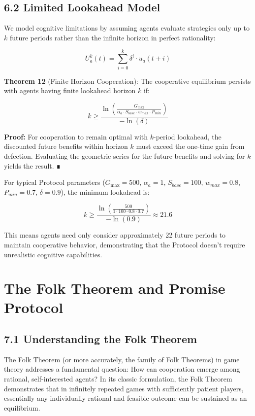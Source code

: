 \documentclass[11pt]{article}
\begin{document}
\subsection{6.2 Limited Lookahead Model}
\label{sec:org3d7af79}
We model cognitive limitations by assuming agents evaluate strategies only up to \(k\) future periods rather than the infinite horizon in perfect rationality:

\[
U_a^k(t) = \sum_{i=0}^{k} \delta^i \cdot u_a(t+i)
\]

\textbf{Theorem 12} (Finite Horizon Cooperation):
The cooperative equilibrium persists with agents having finite lookahead horizon \(k\) if:

\[
k \geq \frac{\ln\left(\frac{G_{\max}}{\alpha_a \cdot S_{base} \cdot w_{max} \cdot P_{min}}\right)}{-\ln(\delta)}
\]

\textbf{Proof:}
For cooperation to remain optimal with \(k\)-period lookahead, the discounted future benefits within horizon \(k\) must exceed the one-time gain from defection. Evaluating the geometric series for the future benefits and solving for \(k\) yields the result. ∎

For typical Protocol parameters (\(G_{\max} = 500\), \(\alpha_a = 1\), \(S_{base} = 100\), \(w_{max} = 0.8\), \(P_{min} = 0.7\), \(\delta = 0.9\)), the minimum lookahead is:

\[
k \geq \frac{\ln\left(\frac{500}{1 \cdot 100 \cdot 0.8 \cdot 0.7}\right)}{-\ln(0.9)} \approx 21.6
\]

This means agents need only consider approximately 22 future periods to maintain cooperative behavior, demonstrating that the Protocol doesn't require unrealistic cognitive capabilities.
\section{The Folk Theorem and Promise Protocol}
\label{sec:orgd9d811f}
\subsection{7.1 Understanding the Folk Theorem}
\label{sec:org81e5b54}
The Folk Theorem (or more accurately, the family of Folk Theorems) in game theory addresses a fundamental question: How can cooperation emerge among rational, self-interested agents? In its classic formulation, the Folk Theorem demonstrates that in infinitely repeated games with sufficiently patient players, essentially any individually rational and feasible outcome can be sustained as an equilibrium.
\end{document}

